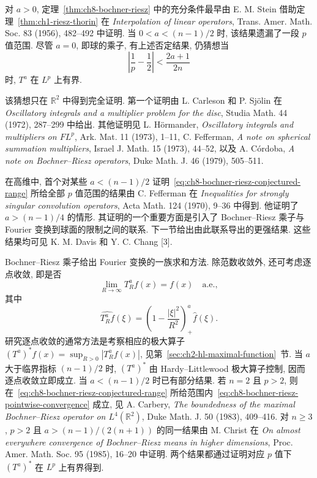 对 $a>0$, 定理~\ref{thm:ch8-bochner-riesz} 中的充分条件最早由 E. M. Stein 借助定理~\ref{thm:ch1-riesz-thorin} 在 \textit{Interpolation of linear operators}, Trans. Amer. Math. Soc. 83 (1956), 482--492 中证明. 当 $0<a<(n-1)/2$ 时, 该结果遗漏了一段 $p$ 值范围. 尽管 $a=0$, 即球的乘子, 有上述否定结果, 仍猜想当
\begin{equation}
 \left|\frac1p-\frac12\right|<\frac{2a+1}{2n}
 \label{eq:ch8-bochner-riesz-conjectured-range}
\end{equation}
时, $T^a$ 在 $L^p$ 上有界.

该猜想只在 $\mathbb R^2$ 中得到完全证明. 第一个证明由 L. Carleson 和 P. Sjölin 在 \textit{Oscillatory integrals and a multiplier problem for the disc}, Studia Math. 44 (1972), 287--299 中给出. 其他证明见 L. Hörmander, \textit{Oscillatory integrals and multipliers on $FL^p$}, Ark. Mat. 11 (1973), 1--11, C. Fefferman, \textit{A note on spherical summation multipliers}, Israel J. Math. 15 (1973), 44--52, 以及 A. Córdoba, \textit{A note on Bochner--Riesz operators}, Duke Math. J. 46 (1979), 505--511.

在高维中, 首个对某些 $a<(n-1)/2$ 证明~\eqref{eq:ch8-bochner-riesz-conjectured-range} 所给全部 $p$ 值范围的结果由 C. Fefferman 在 \textit{Inequalities for strongly singular convolution operators}, Acta Math. 124 (1970), 9--36 中得到. 他证明了 $a>(n-1)/4$ 的情形. 其证明的一个重要方面是引入了 Bochner--Riesz 乘子与 Fourier 变换到球面的限制之间的联系. 下一节给出由此联系导出的更强结果. 这些结果均可见 K. M. Davis 和 Y. C. Chang [3].

\hypertarget{chapter-08-page-200}{}
Bochner--Riesz 乘子给出 Fourier 变换的一族求和方法. 除范数收敛外, 还可考虑逐点收敛, 即是否
\begin{equation}
 \lim_{R\to\infty}T_R^af(x)=f(x)\quad\text{a.e.},
 \label{eq:ch8-bochner-riesz-pointwise-convergence}
\end{equation}
其中
\[
 \widehat{T_R^af}(\xi)=\left(1-\frac{|\xi|^2}{R^2}\right)_+^a\widehat f(\xi).
\]
研究逐点收敛的通常方法是考察相应的极大算子 $(T^a)^*f(x)=\sup_{R>0}|T_R^af(x)|$, 见第~\ref{sec:ch2-hl-maximal-function}~节. 当 $a$ 大于临界指标 $(n-1)/2$ 时, $(T^a)^*$ 由 Hardy--Littlewood 极大算子控制, 因而逐点收敛立即成立. 当 $a<(n-1)/2$ 时已有部分结果. 若 $n=2$ 且 $p>2$, 则在~\eqref{eq:ch8-bochner-riesz-conjectured-range} 所给范围内~\eqref{eq:ch8-bochner-riesz-pointwise-convergence} 成立, 见 A. Carbery, \textit{The boundedness of the maximal Bochner--Riesz operator on $L^4(\mathbb R^2)$}, Duke Math. J. 50 (1983), 409--416. 对 $n\ge3$, $p>2$ 且 $a>(n-1)/(2(n+1))$ 的同一结果由 M. Christ 在 \textit{On almost everywhere convergence of Bochner--Riesz means in higher dimensions}, Proc. Amer. Math. Soc. 95 (1985), 16--20 中证明. 两个结果都通过证明对应 $p$ 值下 $(T^a)^*$ 在 $L^p$ 上有界得到.

